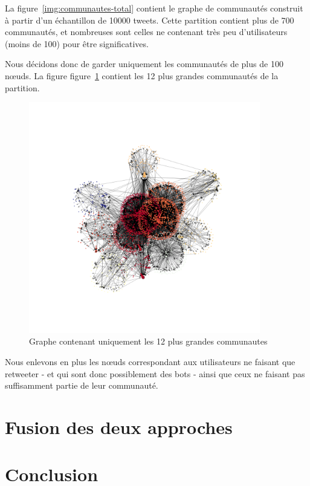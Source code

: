 \documentclass[a4paper]{article}
\newcommand{\figref}[1]{figure~\ref{#1}}
\begin{document}
La \figref{img:communautes-total} contient le graphe de communautés construit à
partir d'un échantillon de 10000 tweets. Cette partition contient plus de 700
communautés, et nombreuses sont celles ne contenant très peu d'utilisateurs
(moins de 100) pour être significatives.

Nous décidons donc de garder uniquement les communautés de plus de 100 nœuds. La
figure \figref{img:communautes-12} contient les 12 plus grandes communautés de
la partition.

\begin{figure}[H]
	\center 
	\includegraphics[width=0.9\textwidth]{images/analyse_communautes/communautes_12.png}
    \caption{Graphe contenant uniquement les 12 plus grandes communautes}
    \label{img:communautes-12}
\end{figure}

Nous enlevons en plus les nœuds correspondant aux utilisateurs ne faisant que
retweeter - et qui sont donc possiblement des bots - ainsi que ceux ne faisant
pas suffisamment partie de leur communauté.





\newpage

\section{Fusion des deux approches}

\newpage

\section{Conclusion}

\printbibliography
\end{document}
